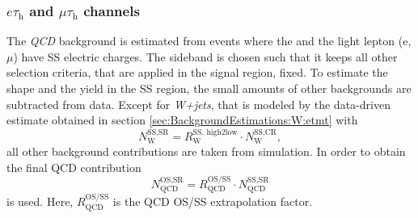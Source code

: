 \subsubsection{$e\tau_\text{h}$ and $\mu\tau_\text{h}$ channels}

The \textit{QCD} background is estimated from events where the \tauh{} and the light lepton (e,$\mu$) have SS electric charges. The sideband is chosen such that it keeps all other selection criteria, that are applied in the 
signal region, fixed. To estimate the shape and the yield in the SS region, 
the small amounts of other backgrounds are subtracted from data. 
Except for \textit{W+jets}, that is modeled by the data-driven estimate obtained in section \ref{sec:BackgroundEstimations:W:etmt} with 
\begin{equation}
    N_\text{W}^\text{SS,SR} = R_\text{W}^\text{SS, high2low} \cdot N_\text{W}^\text{SS,CR},
\end{equation}
all other background contributions are taken from simulation. In order to obtain the final
QCD contribution 
\begin{equation}
    N_\text{QCD}^\text{OS,SR} = R_\text{QCD}^\text{OS/SS}\cdot N_\text{QCD}^\text{SS,SR}
\end{equation}
is used.
Here, $R_\text{QCD}^\text{OS/SS}$ is the QCD OS/SS extrapolation factor. 

